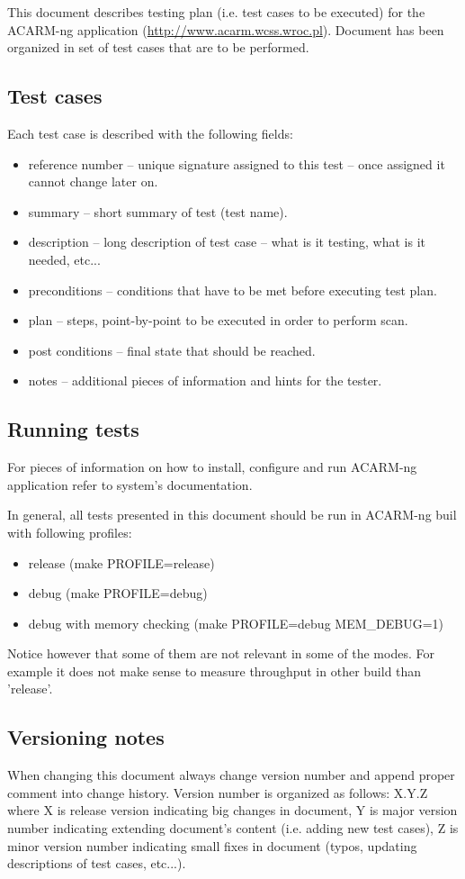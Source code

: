 This document describes testing plan (i.e. test cases to be executed) for the ACARM-ng application
(\url{http://www.acarm.wcss.wroc.pl}). Document has been organized in set of test cases that are to be performed.



\subsection{Test cases}
Each test case is described with the following fields:
\begin{itemize}
  \item reference number -- unique signature assigned to this test -- once assigned it cannot change later on.
  \item summary -- short summary of test (test name).
  \item description -- long description of test case -- what is it testing, what is it needed, etc...
  \item preconditions -- conditions that have to be met before executing test plan.
  \item plan -- steps, point-by-point to be executed in order to perform scan.
  \item post conditions -- final state that should be reached.
  \item notes -- additional pieces of information and hints for the tester.
\end{itemize}



\subsection{Running tests}
For pieces of information on how to install, configure and run ACARM-ng application refer to system's documentation.

In general, all tests presented in this document should be run in ACARM-ng buil with following profiles:
\begin{itemize}
\item release (make PROFILE=release)
\item debug (make PROFILE=debug)
\item debug with memory checking (make PROFILE=debug MEM\_DEBUG=1)
\end{itemize}
Notice however that some of them are not relevant in some of the modes. For example it does not make sense
to measure throughput in other build than 'release'.



\subsection{Versioning notes}
When changing this document always change version number and append proper comment into change history.
Version number is organized as follows: X.Y.Z where X is release version indicating big changes in document,
Y is major version number indicating extending document's content (i.e. adding new test cases), Z is minor
version number indicating small fixes in document (typos, updating descriptions of test cases, etc...).
